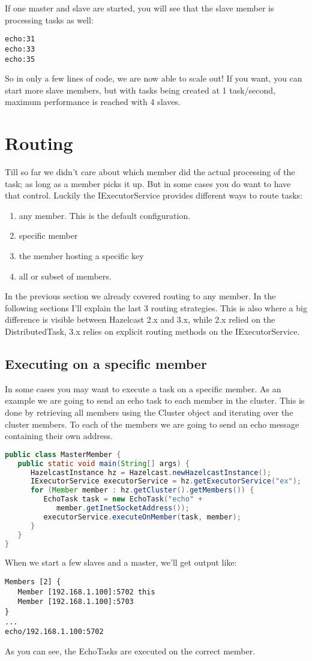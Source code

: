 If one master and slave are started, you will see that the slave member is processing tasks as well:
\begin{lstlisting}
echo:31
echo:33
echo:35	
\end{lstlisting}
So in only a few lines of code, we are now able to scale out! If you want, you can start more slave members, but with tasks being created at 1 task/second, maximum performance is reached with 4 slaves.

\section{Routing}
Till so far we didn't care about which member did the actual processing of the task; as long as a member picks it up. But in some cases you do want to have that control. Luckily the IExecutorService provides different ways to route tasks:
\begin{enumerate}
\item any member. This is the default configuration.
\item specific member
\item the member hosting a specific key
\item all or subset of members.
\end{enumerate}
In the previous section we already covered routing to any member. In the following sections I'll explain the last 3 routing strategies. This is also where a big difference is visible between Hazelcast 2.x and 3.x, while 2.x relied on the DistributedTask, 3.x relies on explicit routing methods on the IExecutorService. 

\subsection{Executing on a specific member}
In some cases you may want to execute a task on a specific member. As an example we are going to send an echo task to each member in the cluster. This is done by retrieving all members using the Cluster object and iterating over the cluster members. To each of the members we are going to send an echo message containing their own address. 
\begin{lstlisting}[language=java]
public class MasterMember {
   public static void main(String[] args) {
      HazelcastInstance hz = Hazelcast.newHazelcastInstance();
      IExecutorService executorService = hz.getExecutorService("ex");
      for (Member member : hz.getCluster().getMembers()) {
         EchoTask task = new EchoTask("echo" + 
            member.getInetSocketAddress());
         executorService.executeOnMember(task, member);
      }
   }
}
\end{lstlisting}
When we start a few slaves and a master, we'll get output like:
\begin{lstlisting}
Members [2] {
   Member [192.168.1.100]:5702 this
   Member [192.168.1.100]:5703
}
...
echo/192.168.1.100:5702
\end{lstlisting}
As you can see, the EchoTasks are executed on the correct member.

